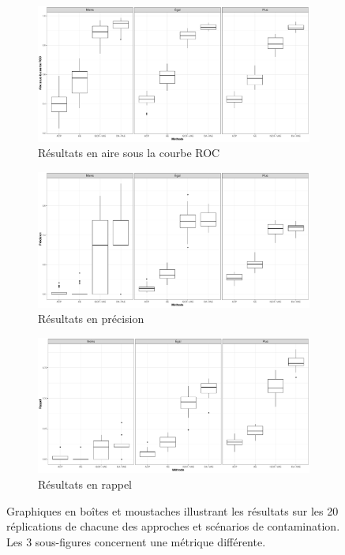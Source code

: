 \begin{figure}[H]
	\centering
	\begin{subfigure}{12cm}
		\includegraphics[width=12cm]{images/images_boxplots/auc_cars.pdf}
		\caption{Résultats en aire sous la courbe ROC}
	\end{subfigure}
	\begin{subfigure}{12cm}
		\includegraphics[width=12cm]{images/images_boxplots/precision_cars.pdf}
		\caption{Résultats en précision}
	\end{subfigure}
	\begin{subfigure}{12cm}
		\includegraphics[width=12cm]{images/images_boxplots/recall_cars.pdf}
		\caption{Résultats en rappel}
	\end{subfigure}
	\caption{Graphiques en boîtes et moustaches illustrant les résultats sur les 20 réplications de chacune des approches et scénarios de contamination. Les 3 sous-figures concernent une métrique différente.}
	\label{fig:auc_cars}
\end{figure}

